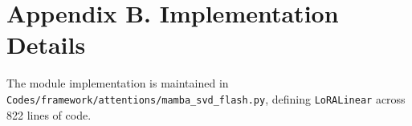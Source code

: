 \section*{Appendix B. Implementation Details}
The module implementation is maintained in \texttt{Codes/framework/attentions/mamba\_svd\_flash.py}, defining \texttt{LoRALinear} across 822 lines of code.
